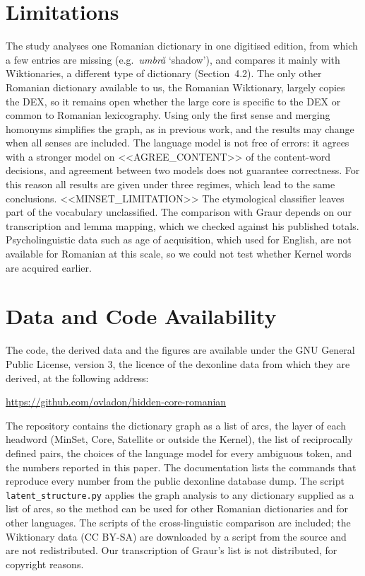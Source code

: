\documentclass[11pt]{article}
\newcommand{\ro}[1]{\textit{#1}}
\begin{document}
\section{Limitations}
The study analyses one Romanian dictionary in one digitised edition, from which a few entries are missing (e.g.\ \ro{umbră} `shadow'), and compares it mainly with Wiktionaries, a different type of dictionary (Section~4.2). The only other Romanian dictionary available to us, the Romanian Wiktionary, largely copies the DEX, so it remains open whether the large core is specific to the DEX or common to Romanian lexicography. Using only the first sense and merging homonyms simplifies the graph, as in previous work, and the results may change when all senses are included. The language model is not free of errors: it agrees with a stronger model on <<AGREE_CONTENT>> of the content-word decisions, and agreement between two models does not guarantee correctness. For this reason all results are given under three regimes, which lead to the same conclusions. <<MINSET_LIMITATION>> The etymological classifier leaves part of the vocabulary unclassified. The comparison with Graur depends on our transcription and lemma mapping, which we checked against his published totals. Psycholinguistic data such as age of acquisition, which  used for English, are not available for Romanian at this scale, so we could not test whether Kernel words are acquired earlier.

\section{Data and Code Availability}
The code, the derived data and the figures are available under the GNU General Public License, version 3, the licence of the dexonline data from which they are derived, at the following address:

\url{https://github.com/ovladon/hidden-core-romanian}

The repository contains the dictionary graph as a list of arcs, the layer of each headword (MinSet, Core, Satellite or outside the Kernel), the list of reciprocally defined pairs, the choices of the language model for every ambiguous token, and the numbers reported in this paper. The documentation lists the commands that reproduce every number from the public dexonline database dump. The script \texttt{latent\_structure.py} applies the graph analysis to any dictionary supplied as a list of arcs, so the method can be used for other Romanian dictionaries and for other languages. The scripts of the cross-linguistic comparison are included; the Wiktionary data (CC BY-SA) are downloaded by a script from the source and are not redistributed. Our transcription of Graur's list is not distributed, for copyright reasons.
\end{document}
